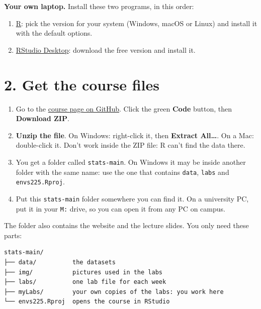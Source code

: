 \documentclass[
  letterpaper,
  DIV=11,
  numbers=noendperiod]{scrreprt}
\providecommand{\tightlist}{%
  \setlength{\itemsep}{0pt}\setlength{\parskip}{0pt}}
\begin{document}
\textbf{Your own laptop.} Install these two programs, in this order:

\begin{enumerate}
\def\labelenumi{\arabic{enumi}.}
\tightlist
\item
  \href{https://cran.r-project.org/}{R}: pick the version for your
  system (Windows, macOS or Linux) and install it with the default
  options.
\item
  \href{https://posit.co/download/rstudio-desktop/}{RStudio Desktop}:
  download the free version and install it.
\end{enumerate}

\section*{2. Get the course files}\label{get-the-course-files}


\begin{enumerate}
\def\labelenumi{\arabic{enumi}.}
\tightlist
\item
  Go to the \href{https://github.com/GDSL-UL/stats}{course page on
  GitHub}. Click the green \textbf{Code} button, then \textbf{Download
  ZIP}.
\item
  \textbf{Unzip the file}. On Windows: right-click it, then
  \textbf{Extract All\ldots{}}. On a Mac: double-click it. Don't work
  inside the ZIP file: R can't find the data there.
\item
  You get a folder called \texttt{stats-main}. On Windows it may be
  inside another folder with the same name: use the one that contains
  \texttt{data}, \texttt{labs} and \texttt{envs225.Rproj}.
\item
  Put this \texttt{stats-main} folder somewhere you can find it. On a
  university PC, put it in your \texttt{M:} drive, so you can open it
  from any PC on campus.
\end{enumerate}

The folder also contains the website and the lecture slides. You only
need these parts:

\begin{verbatim}
stats-main/
├── data/          the datasets
├── img/           pictures used in the labs
├── labs/          one lab file for each week
├── myLabs/        your own copies of the labs: you work here
└── envs225.Rproj  opens the course in RStudio
\end{verbatim}
\end{document}

